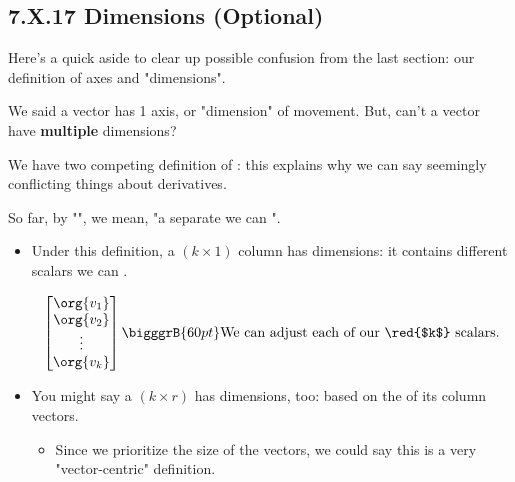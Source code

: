     \subsection*{7.X.17 \quad Dimensions (Optional)}
        \label{7.X.17}
    
        Here's a quick aside to clear up possible confusion from the last section: our definition of axes and "dimensions".
        
        We said a vector has 1 axis, or "dimension" of movement. But, can't a vector have \textbf{multiple} dimensions?\\
        
        \begin{clarification}
            We have two competing definition of : this explains why we can say seemingly conflicting things about derivatives.
            
            \boxdiv
            
            So far, by "", we mean, "a separate  we can ".
            
            \begin{itemize}
                \item Under this definition, a $(k \times 1)$ column  has  dimensions: it contains  different scalars we can .
                
                \begin{equation*}
                    \begin{bmatrix}
                        \org{v_1} \\ \org{v_2} \\ \vdots \\ \org{v_k}  
                    \end{bmatrix}
                    \bigggrB{60pt} \text{We can adjust each of our \red{$k$} scalars.}
                \end{equation*}
                
                \item You might say a $(k \times r)$  has  dimensions, too: based on the  of its column vectors.
                    \begin{itemize}
                        \item Since we prioritize the size of the vectors, we could say this is a very "vector-centric" definition.
                    \end{itemize}
            \end{itemize}
            

\end{clarification}
